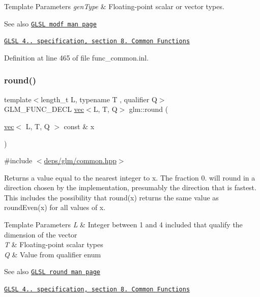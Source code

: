 \begin{DoxyTemplParams}{Template Parameters}
{\em gen\+Type} & Floating-\/point scalar or vector types.\\
\hline
\end{DoxyTemplParams}
\begin{DoxySeeAlso}{See also}
\href{http://www.opengl.org/sdk/docs/manglsl/xhtml/modf.xml}{\tt G\+L\+SL modf man page} 

\href{http://www.opengl.org/registry/doc/GLSLangSpec.4.20.8.pdf}{\tt G\+L\+SL 4.. specification, section 8. Common Functions} 
\end{DoxySeeAlso}


Definition at line 465 of file func\+\_\+common.\+inl.

\mbox{\label{group__core__func__common_gafa03aca8c4713e1cc892aa92ca135a7e}} 
\subsubsection{\texorpdfstring{round()}{round()}}
{\footnotesize\ttfamily template$<$length\+\_\+t L, typename T , qualifier Q$>$ \\
G\+L\+M\+\_\+\+F\+U\+N\+C\+\_\+\+D\+E\+CL \hyperlink{structglm_1_1vec}{vec}$<$L, T, Q$>$ glm\+::round (\begin{DoxyParamCaption}\item[{\hyperlink{structglm_1_1vec}{vec}$<$ L, T, Q $>$ const \&}]{x }\end{DoxyParamCaption})}



{\ttfamily \#include $<$\hyperlink{common_8hpp}{deps/glm/common.\+hpp}$>$}

Returns a value equal to the nearest integer to x. The fraction 0. will round in a direction chosen by the implementation, presumably the direction that is fastest. This includes the possibility that round(x) returns the same value as round\+Even(x) for all values of x.


\begin{DoxyTemplParams}{Template Parameters}
{\em L} & Integer between 1 and 4 included that qualify the dimension of the vector \\
\hline
{\em T} & Floating-\/point scalar types \\
\hline
{\em Q} & Value from qualifier enum\\
\hline
\end{DoxyTemplParams}
\begin{DoxySeeAlso}{See also}
\href{http://www.opengl.org/sdk/docs/manglsl/xhtml/round.xml}{\tt G\+L\+SL round man page} 

\href{http://www.opengl.org/registry/doc/GLSLangSpec.4.20.8.pdf}{\tt G\+L\+SL 4.. specification, section 8. Common Functions} 
\end{DoxySeeAlso}


